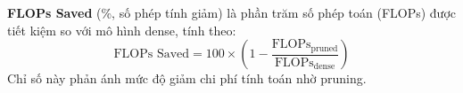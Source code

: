     	\textbf{FLOPs Saved} (\%, số phép tính giảm) là phần trăm số phép toán (FLOPs) được tiết kiệm so với mô hình dense, tính theo:
    \begin{equation}
        	\text{FLOPs Saved} = 100 \times \left(1 - \frac{\text{FLOPs}_{\text{pruned}}}{\text{FLOPs}_{\text{dense}}}\right)
    \end{equation}
    Chỉ số này phản ánh mức độ giảm chi phí tính toán nhờ pruning.